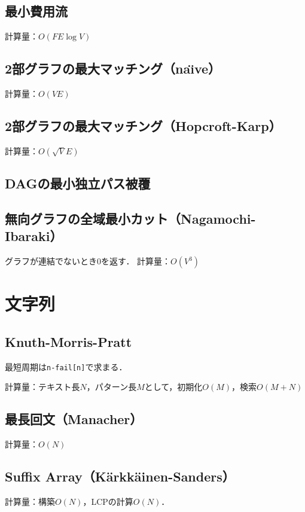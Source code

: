\documentclass[landscape,twocolumn,9pt]{jsarticle}
\begin{document}
\subsection{最小費用流}
計算量：$O(FE\log V)$


\subsection{2部グラフの最大マッチング（na\"\i ve）}
計算量：$O(VE)$


\subsection{2部グラフの最大マッチング（Hopcroft-Karp）}
計算量：$O(\sqrt{V}E)$


\subsection{DAGの最小独立パス被覆}


\subsection{無向グラフの全域最小カット（Nagamochi-Ibaraki）}
グラフが連結でないとき0を返す．
計算量：$O(V^3)$


\section{文字列}%
\subsection{Knuth-Morris-Pratt}
最短周期は\texttt{n-fail[n]}で求まる．

計算量：テキスト長$N$，パターン長$M$として，初期化$O(M)$，検索$O(M+N)$


\subsection{最長回文（Manacher）}
計算量：$O(N)$


\subsection{Suffix Array（K\"arkk\"ainen-Sanders）}
計算量：構築$O(N)$，LCPの計算$O(N)$．

\end{document}
